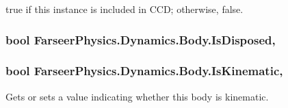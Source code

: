 {\ttfamily true} if this instance is included in C\+C\+D; otherwise, {\ttfamily false}.\hypertarget{class_farseer_physics_1_1_dynamics_1_1_body_a44eef473e47ff317a56975cdad5fc92e}{
\subsubsection[{Is\+Disposed}]{\setlength{\rightskip}{0pt plus 5cm}bool Farseer\+Physics.\+Dynamics.\+Body.\+Is\+Disposed\hspace{0.3cm}{\ttfamily [get]}, {\ttfamily [set]}}}\label{class_farseer_physics_1_1_dynamics_1_1_body_a44eef473e47ff317a56975cdad5fc92e}
\hypertarget{class_farseer_physics_1_1_dynamics_1_1_body_a4488451c0dff0c328d772032ff776f31}{
\subsubsection[{Is\+Kinematic}]{\setlength{\rightskip}{0pt plus 5cm}bool Farseer\+Physics.\+Dynamics.\+Body.\+Is\+Kinematic\hspace{0.3cm}{\ttfamily [get]}, {\ttfamily [set]}}}\label{class_farseer_physics_1_1_dynamics_1_1_body_a4488451c0dff0c328d772032ff776f31}


Gets or sets a value indicating whether this body is kinematic. 

